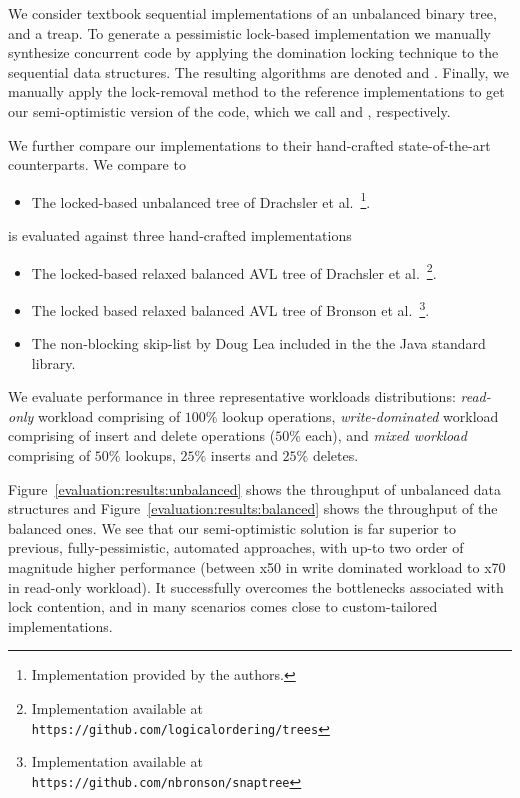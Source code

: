 We consider textbook sequential implementations of an unbalanced binary
tree, and a treap. To
generate a pessimistic lock-based implementation we manually synthesize
concurrent code by applying the domination locking technique to the sequential
data structures. The resulting algorithms are denoted \domTree and \domTreap.
Finally, we manually apply the lock-removal method to the reference
implementations to get our semi-optimistic version of the code, which we call
\autoTree and \autoTreap, respectively.     

We further compare our implementations to their hand-crafted state-of-the-art counterparts. We compare \autoTree to
\begin{itemize}
\item \danaTree The locked-based 
				unbalanced tree of Drachsler et
				al.~\cite{DrachslerVY2014}\footnote{Implementation provided by the authors.}.
\end{itemize}
\autoTreap is evaluated against three hand-crafted implementations
\begin{itemize}
\item \danaAVL The locked-based relaxed balanced AVL tree of 
				Drachsler et al.~\cite{DrachslerVY2014}\footnote{Implementation available at \\
				\texttt{https://github.com/logicalordering/trees}}.
\item \bronson The locked based relaxed balanced AVL tree
				of Bronson et al.~\cite{BronsonCCO2010}\footnote{Implementation available at \\
				\texttt{https://github.com/nbronson/snaptree}}.
\item \skiplist The non-blocking skip-list by Doug 
				Lea included in the 
				the Java standard library.
\end{itemize}

We evaluate performance in three representative workloads distributions:
\emph{read-only} workload comprising of $100\%$ lookup operations, \emph{write-dominated}
workload comprising of insert and delete operations ($50\%$ each), and
\emph{mixed workload} comprising of $50\%$ lookups, $25\%$ inserts and $25\%$
deletes.

Figure~\ref{evaluation:results:unbalanced} 
shows the throughput of unbalanced data structures and Figure~\ref{evaluation:results:balanced} shows
the throughput of the balanced ones. We see that our semi-optimistic
solution is far superior to previous, fully-pessimistic, 
automated approaches, with up-to two order of magnitude higher performance
(between x50 in write dominated workload to x70 in read-only workload). It
successfully overcomes the bottlenecks associated with lock contention, and in
many scenarios comes close to custom-tailored implementations. 

